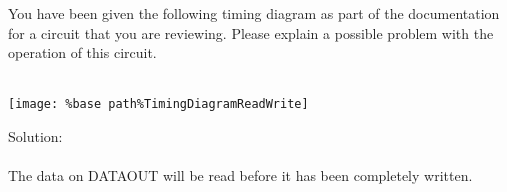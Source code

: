 You have been given the following timing diagram as part of the documentation for a circuit that you are reviewing.  Please explain a possible problem with the operation of this circuit.\\ \\
\begin{center}
  \texttt{[image: \%base path\%TimingDiagramReadWrite]}
\end{center}

Solution: \\ \\
The data on DATAOUT will be read before it has been completely written.
